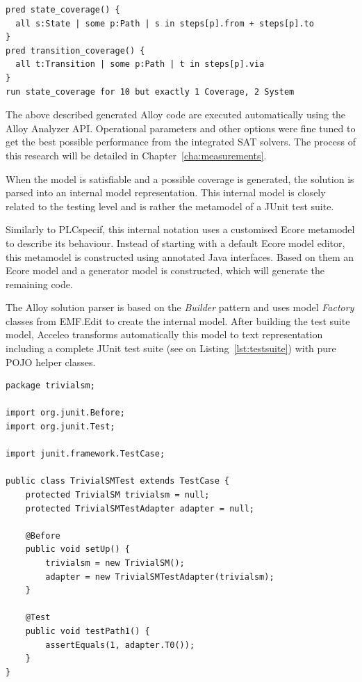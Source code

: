 \begin{description}
\begin{lstlisting}[label={lst:alloycriteria}, caption=Formalising criteria with Alloy,breaklines=true]
pred state_coverage() {
  all s:State | some p:Path | s in steps[p].from + steps[p].to
}
pred transition_coverage() {
  all t:Transition | some p:Path | t in steps[p].via
}
run state_coverage for 10 but exactly 1 Coverage, 2 System
\end{lstlisting}

The above described generated Alloy code are executed automatically using the Alloy Analyzer API. Operational parameters and other options were fine tuned to get the best possible performance from the integrated SAT solvers. The process of this research will be detailed in Chapter~\ref{cha:measurements}.

When the model is satisfiable and a possible coverage is generated, the solution is parsed into an internal model representation. This internal model is closely related to the testing level and is rather the metamodel of a JUnit test suite.

Similarly to PLCspecif, this internal notation uses a customised Ecore metamodel to describe its behaviour. Instead of starting with a default Ecore model editor, this metamodel is constructed using annotated Java interfaces. Based on them an Ecore model and a generator model is constructed, which will generate the remaining code.

The Alloy solution parser is based on the \textit{Builder} pattern and uses model \textit{Factory} classes from EMF.Edit to create the internal model. After building the test suite model, Acceleo transforms automatically this model to text representation including a complete JUnit test suite (see on Listing~\ref{lst:testsuite}) with pure POJO helper classes.

\begin{lstlisting}[label={lst:testsuite}, caption=Generated JUnit test suite,breaklines=true]
package trivialsm;

import org.junit.Before;
import org.junit.Test;

import junit.framework.TestCase;

public class TrivialSMTest extends TestCase {
	protected TrivialSM trivialsm = null;
	protected TrivialSMTestAdapter adapter = null;
	   
	@Before 
	public void setUp() {
		trivialsm = new TrivialSM();
		adapter = new TrivialSMTestAdapter(trivialsm);
	}
	
	@Test
	public void testPath1() {
		assertEquals(1, adapter.T0());
	}
}
\end{lstlisting}


\end{description}
